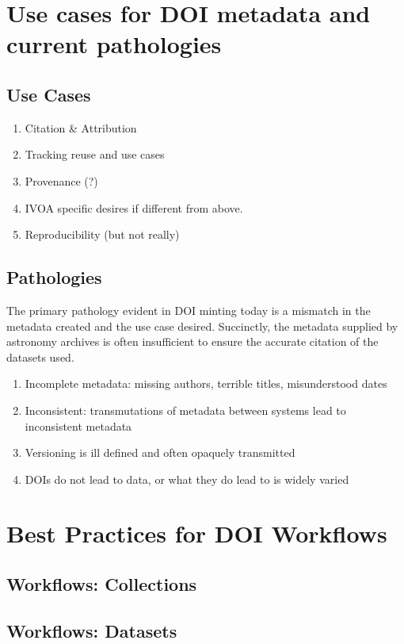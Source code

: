 \documentclass[11pt,a4paper]{ivoa}
\begin{document}
\section{Use cases for DOI metadata and current pathologies}

\subsection{Use Cases}
\begin{enumerate}
\item Citation \& Attribution
\item Tracking reuse and use cases
\item Provenance (?)
\item IVOA specific desires if different from above.
\item Reproducibility (but not really)
\end{enumerate}


\subsection{Pathologies}
The primary pathology evident in DOI minting today is a mismatch in the metadata created and the use case desired. 
Succinctly, the metadata supplied by astronomy archives is often insufficient to ensure the accurate citation of the datasets used. 

\begin{enumerate}
\item Incomplete metadata: missing authors, terrible titles, misunderstood dates 
\item Inconsistent: transmutations of metadata between systems lead to inconsistent metadata
\item Versioning is ill defined and often opaquely transmitted
\item DOIs do not lead to data, or what they do lead to is widely varied
\end{enumerate}


\section{Best Practices for DOI Workflows}

\subsection{Workflows: Collections}
\subsection{Workflows: Datasets}
\end{document}
